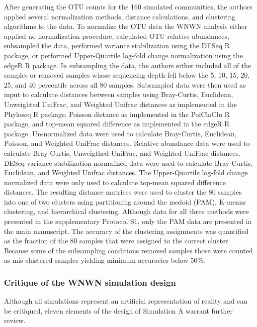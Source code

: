 \documentclass[
]{article}
\begin{document}
After generating the OTU counts for the 160 simulated communities, the
authors applied several normalization methods, distance calculations,
and clustering algorithms to the data. To normalize the OTU data the
WNWN analysis either applied no normalization procedure, calculated OTU
relative abundances, subsampled the data, performed variance
stabilization using the DESeq R package, or performed Upper-Quartile
log-fold change normalization using the edgeR R package. In subsampling
the data, the authors either included all of the samples or removed
samples whose sequencing depth fell below the 5, 10, 15, 20, 25, and 40
percentile across all 80 samples. Subsampled data were then used as
input to calculate distances between samples using Bray-Curtis,
Euclidean, Unweighted UniFrac, and Weighted Unifrac distances as
implemented in the Phyloseq R package, Poisson distance as implemented
in the PoiClaClu R package, and top-mean squared difference as
implemented in the edgeR R package. Un-normalized data were used to
calculate Bray-Curtis, Euclidean, Poisson, and Weighted UniFrac
distances. Relative abundance data were used to calculate Bray-Curtis,
Unweigthed UniFrac, and Weighted UniFrac distances. DESeq variance
stabilization normalized data were used to calculate Bray-Curtis,
Euclidean, and Weighted Unifrac distances. The Upper-Quartile log-fold
change normalized data were only used to calculate top-mean squared
difference distances. The resulting distance matrices were used to
cluster the 80 samples into one of two clusters using partitioning
around the medoid (PAM), K-means clustering, and hierarchical
clustering. Although data for all three methods were presented in the
supplementary Protocol S1, only the PAM data are presented in the main
manuscript. The accuracy of the clustering assignments was quantified as
the fraction of the 80 samples that were assigned to the correct
cluster. Because some of the subsampling conditions removed samples
those were counted as mis-clustered samples yielding minimum accuracies
below 50\%.

\hypertarget{critique-of-the-wnwn-simulation-design}{%
\subsubsection{Critique of the WNWN simulation
design}\label{critique-of-the-wnwn-simulation-design}}

Although all simulations represent an artificial representation of
reality and can be critiqued, eleven elements of the design of
Simulation A warrant further review.
\end{document}
